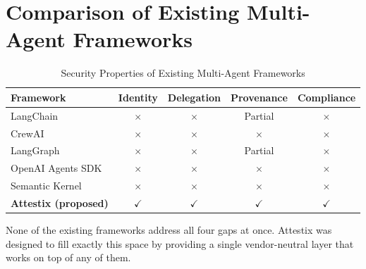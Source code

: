 \section{Comparison of Existing Multi-Agent Frameworks}

\begin{table}[H]
\centering
\caption{Security Properties of Existing Multi-Agent Frameworks}
\begin{tabular}{|l|c|c|c|c|}
\hline
\textbf{Framework} & \textbf{Identity} & \textbf{Delegation} & \textbf{Provenance} & \textbf{Compliance} \\
\hline
LangChain & $\times$ & $\times$ & Partial & $\times$ \\
CrewAI & $\times$ & $\times$ & $\times$ & $\times$ \\
LangGraph & $\times$ & $\times$ & Partial & $\times$ \\
OpenAI Agents SDK & $\times$ & $\times$ & $\times$ & $\times$ \\
Semantic Kernel & $\times$ & $\times$ & $\times$ & $\times$ \\
\hline
\textbf{Attestix (proposed)} & $\checkmark$ & $\checkmark$ & $\checkmark$ & $\checkmark$ \\
\hline
\end{tabular}
\label{tab:framework_comparison}
\end{table}

None of the existing frameworks address all four gaps at once. Attestix was designed to fill exactly this space by providing a single vendor-neutral layer that works on top of any of them.
